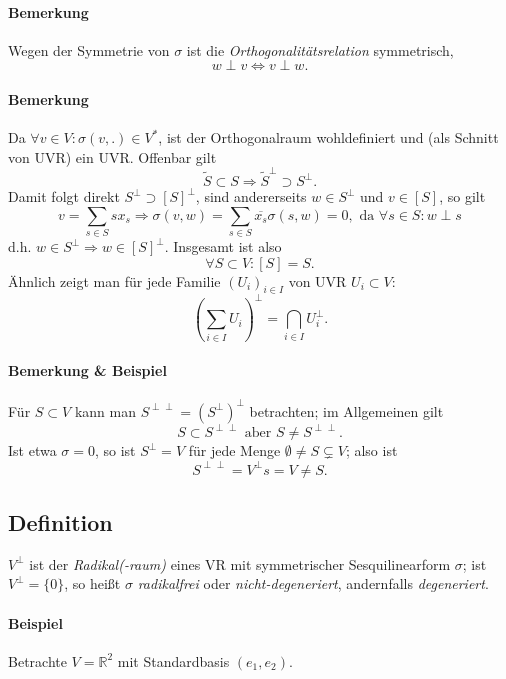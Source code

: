 \paragraph{Bemerkung}
	Wegen der Symmetrie von $ \sigma $ ist die \emph{Orthogonalitätsrelation} symmetrisch,
		\[ w \perp v \Leftrightarrow v \perp w. \]
\paragraph{Bemerkung}
	Da $ \forall v\in V: \sigma(v,.) \in V^* $, ist der Orthogonalraum wohldefiniert und (als Schnitt von UVR) ein UVR. Offenbar gilt
		\[ \tilde{S} \subset S \Rightarrow \tilde{S}^\perp \supset S^\perp. \]
	Damit folgt direkt $ S^\perp \supset [S]^\perp $, sind andererseits $ w\in S^\perp $ und $ v\in [S] $, so gilt
		\[ v = \sum_{s\in S}sx_s \Rightarrow \sigma(v,w)= \sum_{s\in S}\overline{x_s}\sigma(s,w) = 0, \text{ da } \forall s\in S: w\perp s \]
	d.h. $ w\in S^\perp \Rightarrow w\in [S]^\perp. $ Insgesamt ist also
		\[ \forall S \subset V: [S]=S.\]
	Ähnlich zeigt man für jede Familie $ (U_i)_{i\in I} $ von UVR $ U_i\subset V $:
		\[ \left(\sum_{i\in I}U_i \right)^\perp= \bigcap_{i\in I} U_i^\perp. \]
\paragraph{Bemerkung \& Beispiel}
	Für $ S\subset V $ kann man $ S^{\perp\perp} = \left(S^\perp\right)^\perp $ betrachten; im Allgemeinen gilt
		\[ S\subset S^{\perp\perp} \text{ aber } S\neq S^{\perp\perp}. \]
	Ist etwa $ \sigma = 0 $, so ist $ S^\perp = V $ für jede Menge $ \emptyset \neq S\subsetneq V $; also ist
		\[ S^{\perp\perp} = V^\perp s = V \neq S. \]

\subsection{Definition}
\begin{Definition}
$ V^\perp $ ist der \emph{Radikal(-raum)} eines VR mit symmetrischer Sesquilinearform $ \sigma $; ist $ V^\perp = \{0 \} $, so heißt $ \sigma $ \emph{radikalfrei} oder \emph{nicht-degeneriert}, andernfalls \emph{degeneriert}.
\end{Definition}
\paragraph{Beispiel}
	Betrachte $ V=\mathbb{R}^2 $ mit Standardbasis $ (e_1,e_2) $.
	
